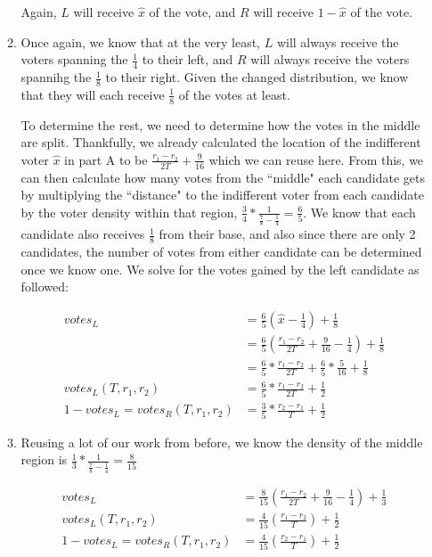 \documentclass[12pt,letterpaper]{article}
\begin{document}
\begin{enumerate}
\begin{enumerate}
	Again, $L$ will receive $\hat{x}$ of the vote, and $R$ will receive $1 - \hat{x}$ of the vote.

	\item Once again, we know that at the very least, $L$ will always receive the voters spanning the $\frac{1}{4}$ to their left, and $R$ will always receive the voters spannihg the $\frac{1}{8}$ to their right. Given the changed distribution, we know that they will each receive $\frac{1}{8}$ of the votes at least.
	
	To determine the rest, we need to determine how the votes in the middle are split. Thankfully, we already calculated the location of the indifferent voter $\hat{x}$ in part A to be $\frac{r_1 - r_2}{2T} + \frac{9}{16}$ which we can reuse here. From this, we can then calculate how many votes from the ``middle" each candidate gets by multiplying the ``distance" to the indifferent voter from each candidate by the voter density within that region, $\frac{3}{4} * \frac{1}{\frac{7}{8} - \frac{1}{4}} = \frac{6}{5}$. We know that each candidate also receives $\frac{1}{8}$ from their base, and also since there are only 2 candidates, the number of votes from either candidate can be determined once we know one. We solve for the votes gained by the left candidate as followed:

	\begin{align*}
		{votes}_L &= \frac{6}{5} (\hat{x} - \frac{1}{4}) + \frac{1}{8} \\
		&= \frac{6}{5} (\frac{r_1-r_2}{2T} + \frac{9}{16} - \frac{1}{4}) + \frac{1}{8} \\
		&= \frac{6}{5} * \frac{r_1 - r_2}{2T} + \frac{6}{5} * \frac{5}{16} + \frac{1}{8} \\
		{votes}_L(T,r_1, r_2) &= \frac{6}{5} * \frac{r_1 - r_2}{2T} + \frac{1}{2} \\
		1 - {votes}_L = {votes}_R(T,r_1, r_2) &= \frac{3}{5} * \frac{r_2 - r_1}{T} + \frac{1}{2}
	\end{align*}

	\item Reusing a lot of our work from before, we know the density of the middle region is $\frac{1}{3}* \frac{1}{\frac{7}{8} - \frac{1}{4}} = \frac{8}{15}$
	
	\begin{align*}
		{votes}_L &= \frac{8}{15} (\frac{r_1 - r_2}{2T} + \frac{9}{16} - \frac{1}{4}) + \frac{1}{3} \\
		{votes}_L(T,r_1, r_2) &= \frac{4}{15} (\frac{r_1 - r_2}{T}) + \frac{1}{2} \\
		1 - {votes}_L  = {votes}_R(T,r_1, r_2) &= \frac{4}{15} (\frac{r_2 - r_1}{T}) + \frac{1}{2}
	\end{align*}


\end{enumerate}
\end{enumerate}
\end{document}
